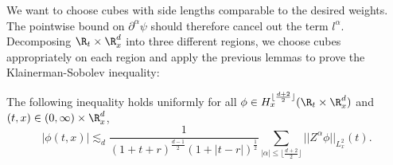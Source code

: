 We want to choose cubes with side lengths comparable to the desired weights. The pointwise bound on $\partial^\alpha \psi$ should therefore cancel out the term $l^\alpha$. Decomposing $\R_t \times \R^d_x$ into three different regions, we choose cubes appropriately on each region and apply the previous lemmas to prove the Klainerman-Sobolev inequality:
\begin{theorem}
	The following inequality holds uniformly for all $\phi \in H_x^{\lfloor \frac{d + 2}{2} \rfloor} (\R_t \times \R^d_x)$ and $(t, x) \in (0, \infty) \times \R^d_x$, 
		\[ |\phi(t, x)| \lesssim_d \frac{1}{(1 + t + r)^{\frac{d - 1}{2}} (1 + |t - r|)^{\frac12}} \sum_{|\alpha| \leq \lfloor \frac{d + 2}{2}\rfloor} ||Z^\alpha \phi||_{L^2_x} (t). \]
\end{theorem}		

